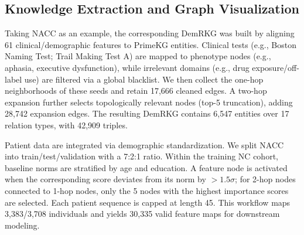 \documentclass[lettersize,journal]{IEEEtran}
\begin{document}
\subsection{Knowledge Extraction and Graph Visualization}


    Taking NACC as an example, the corresponding DemRKG was built by aligning 61 clinical/demographic features to PrimeKG entities. Clinical tests (e.g., Boston Naming Test; Trail Making Test A) are mapped to phenotype nodes (e.g., aphasia, executive dysfunction), while irrelevant domains (e.g., drug exposure/off-label use) are filtered via a global blacklist. We then collect the one-hop neighborhoods of these seeds and retain 17,666 cleaned edges. A two-hop expansion further selects topologically relevant nodes (top-5 truncation), adding 28,742 expansion edges. The resulting DemRKG contains 6,547 entities over 17 relation types, with 42,909 triples.

    Patient data are integrated via demographic standardization. We split NACC into train/test/validation with a 7:2:1 ratio. Within the training NC cohort, baseline norms are stratified by age and education. A feature node is activated when the corresponding score deviates from its norm by $>1.5\sigma$; for 2-hop nodes connected to 1-hop nodes, only the 5 nodes with the highest importance scores are selected. Each patient sequence is capped at length 45. This workflow maps 3,383/3,708 individuals and yields 30,335 valid feature maps for downstream modeling.

    
\end{document}
